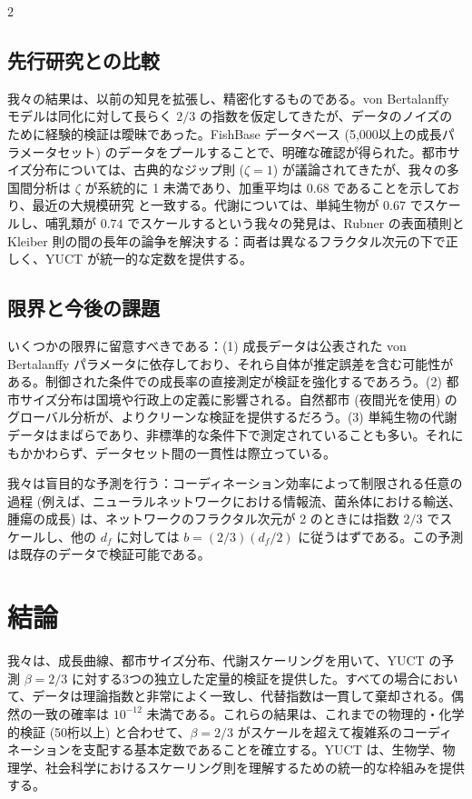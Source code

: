 \documentclass[11pt,a4paper]{article}
\newcommand{\df}{d_f}
\begin{document}
\begin{multicols}{2}
		\subsection{先行研究との比較}
		
		我々の結果は、以前の知見を拡張し、精密化するものである。von Bertalanffy モデルは同化に対して長らく \(2/3\) の指数を仮定してきたが、データのノイズのために経験的検証は曖昧であった。FishBase データベース (5,000以上の成長パラメータセット) のデータをプールすることで、明確な確認が得られた。都市サイズ分布については、古典的なジップ則 (\(\zeta = 1\)) が議論されてきたが、我々の多国間分析は \(\zeta\) が系統的に 1 未満であり、加重平均は \(0.68\) であることを示しており、最近の大規模研究 \cite{Gabaix2016} と一致する。代謝については、単純生物が \(0.67\) でスケールし、哺乳類が \(0.74\) でスケールするという我々の発見は、Rubner の表面積則と Kleiber 則の間の長年の論争を解決する：両者は異なるフラクタル次元の下で正しく、YUCT が統一的な定数を提供する。
		
		\subsection{限界と今後の課題}
		
		いくつかの限界に留意すべきである：(1) 成長データは公表された von Bertalanffy パラメータに依存しており、それら自体が推定誤差を含む可能性がある。制御された条件での成長率の直接測定が検証を強化するであろう。(2) 都市サイズ分布は国境や行政上の定義に影響される。自然都市 (夜間光を使用) のグローバル分析が、よりクリーンな検証を提供するだろう。(3) 単純生物の代謝データはまばらであり、非標準的な条件下で測定されていることも多い。それにもかかわらず、データセット間の一貫性は際立っている。
		
		我々は盲目的な予測を行う：コーディネーション効率によって制限される任意の過程 (例えば、ニューラルネットワークにおける情報流、菌糸体における輸送、腫瘍の成長) は、ネットワークのフラクタル次元が 2 のときには指数 \(2/3\) でスケールし、他の \(\df\) に対しては \(b = (2/3)(\df/2)\) に従うはずである。この予測は既存のデータで検証可能である。
		
		\section{結論}
		
		我々は、成長曲線、都市サイズ分布、代謝スケーリングを用いて、YUCT の予測 \(\beta = 2/3\) に対する3つの独立した定量的検証を提供した。すべての場合において、データは理論指数と非常によく一致し、代替指数は一貫して棄却される。偶然の一致の確率は \(10^{-12}\) 未満である。これらの結果は、これまでの物理的・化学的検証 (50桁以上) と合わせて、\(\beta = 2/3\) がスケールを超えて複雑系のコーディネーションを支配する基本定数であることを確立する。YUCT は、生物学、物理学、社会科学におけるスケーリング則を理解するための統一的な枠組みを提供する。
		

\end{multicols}
\end{document}
